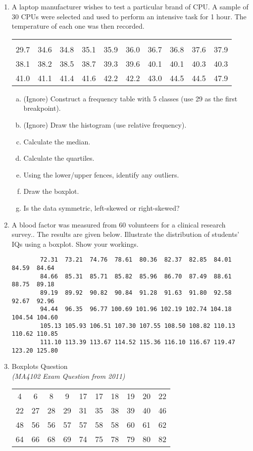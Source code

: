 \documentclass[]{report}
\begin{document}
\begin{enumerate}
\item 
		A laptop manufacturer wishes to test a particular brand of CPU. A sample of 30 CPUs were selected and used to perform an intensive task for 1 hour. The temperature of each one was then recorded.
		\begin{center}
			\begin{tabular}{|cccccccccc|}
				\hline
				&&&&&&&&&\\[-0.4cm]
				29.7 & 34.6 & 34.8 & 35.1 & 35.9 & 36.0 & 36.7 & 36.8 & 37.6 & 37.9\\
				38.1 & 38.2 & 38.5 & 38.7 & 39.3 & 39.6 & 40.1 & 40.1 & 40.3 & 40.3\\
				41.0 & 41.1 & 41.4 & 41.6 & 42.2 & 42.2 & 43.0 & 44.5 & 44.5 & 47.9 \\
				\hline
			\end{tabular}
		\end{center}
		\begin{enumerate}[(a)]
			\item (Ignore) Construct a frequency table with 5 classes (use 29 as the first breakpoint). \item (Ignore) Draw the histogram (use relative frequency). \item Calculate the median. \item Calculate the quartiles. \item Using the lower/upper fences, identify any outliers. \item Draw the boxplot. \quad \item Is the data symmetric, left-skewed or right-skewed?
		\end{enumerate}	
		
\item 	
		A blood factor was measured from 60 volunteers for a clinical research survey.. The results are given below. Illustrate the distribution of students’ IQs using a boxplot. Show your workings.
		\begin{verbatim}
		72.31  73.21  74.76  78.61  80.36  82.37  82.85  84.01  84.59  84.64
		84.66  85.31  85.71  85.82  85.96  86.70  87.49  88.61  88.75  89.18
		89.19  89.92  90.82  90.84  91.28  91.63  91.80  92.58  92.67  92.96
		94.44  96.35  96.77 100.69 101.96 102.19 102.74 104.18 104.54 104.60
		105.13 105.93 106.51 107.30 107.55 108.50 108.82 110.13 110.62 110.85
		111.10 113.39 113.67 114.52 115.36 116.10 116.67 119.47 123.20 125.80
		\end{verbatim}
	\item Boxplots Question \\
\textit{(MA4102 Exam Question from 2011)}
	\begin{center}
		\begin{tabular}{|c|c|c|c|c|c|c|c|c|c|}
			4 & 6 & 8 & 9 & 17 & 17 & 18 & 19 & 20 & 22 \\
			22 & 27 & 28 & 29 & 31 & 35 & 38 & 39 & 40 & 46 \\
			48 & 56 & 56 & 57 & 57 & 58 & 58 & 60 & 61 & 62 \\
			64 & 66 & 68 & 69 & 74 & 75 & 78 & 79 & 80 & 82 \\
		\end{tabular} 
		

\end{center}
\end{enumerate}
\end{document}
